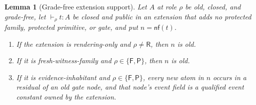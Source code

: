 \documentclass[11pt]{article}
\numberwithin{equation}{section}
\theoremstyle{definition}
\theoremstyle{plain}
\newtheorem{lemma}[definition]{Lemma}
\theoremstyle{remark}
\newcommand{\Frm}{\mathsf F}
\newcommand{\Prs}{\mathsf P}
\newcommand{\Ren}{\mathsf R}
\newcommand{\nf}{\mathsf{nf}}
\begin{document}
\begin{lemma}[Grade-free extension support]\label{lem:extension-support}
Let \(A\) at role \(\rho\) be old, closed, and grade-free, let \(\vdash_{\rho}t:A\) be closed
and public in an extension that adds no protected family, protected primitive,
or gate, and put \(n=\nf(t)\).
\begin{enumerate}[label=(\roman*),leftmargin=2.5em]
\item If the extension is rendering-only and \(\rho\ne\Ren\), then \(n\) is
old.
\item If it is fresh-witness-family and \(\rho\in\{\Frm,\Prs\}\), then \(n\)
is old.
\item If it is evidence-inhabitant and
\(\rho\in\{\Frm,\Prs\}\), every new atom in \(n\) occurs in a residual of an
old gate node, and that node's event field is a qualified event constant owned
by the extension.
\end{enumerate}
\end{lemma}
\end{document}
